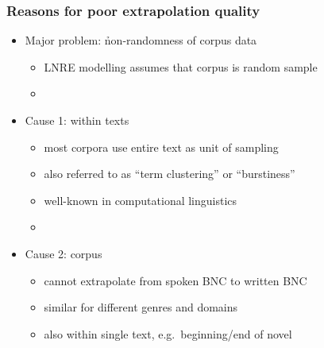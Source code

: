 \documentclass[handout,notes=show,t]{beamer} %
\begin{document}
\begin{frame}
  \frametitle{Reasons for poor extrapolation quality}

  \begin{itemize}
  \item Major problem: \h{non-randomness} of corpus data
    \begin{itemize}
    \item LNRE modelling assumes that corpus is random sample
    \item[]
    \end{itemize}
  \item<2-> Cause 1:  within texts
    \begin{itemize}
    \item most corpora use entire text as unit of sampling
    \item also referred to as ``term clustering'' or ``burstiness''
    \item well-known in computational linguistics \citep{Church:00}
    \item[]
    \end{itemize}
  \item<3-> Cause 2:  corpus
    \begin{itemize}
    \item cannot extrapolate from spoken BNC to written BNC 
    \item similar for different genres and domains
    \item also within single text, e.g.\ beginning/end of novel
    \end{itemize}
  \end{itemize}
\end{frame}
\end{document}
